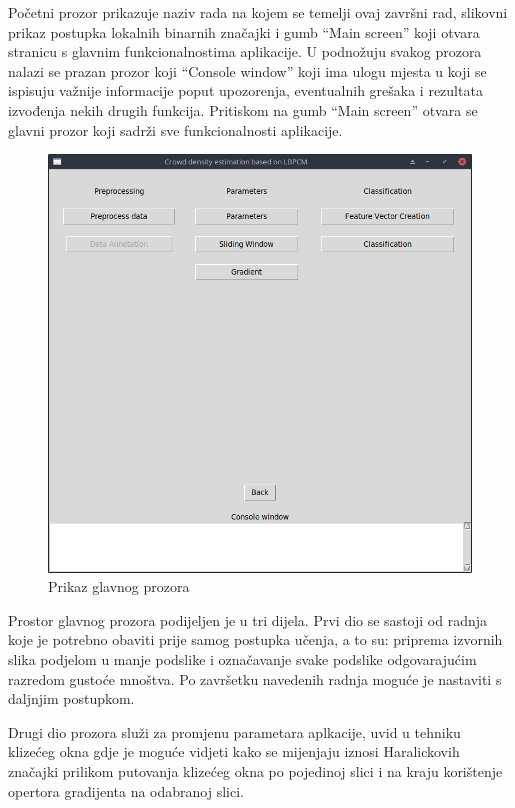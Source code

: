 \documentclass[times, utf8, zavrsni]{fer}
\begin{document}
Početni prozor prikazuje naziv rada na kojem se temelji ovaj završni rad, 
slikovni prikaz postupka lokalnih binarnih značajki i gumb \enquote{Main screen}
koji otvara stranicu s glavnim funkcionalnostima aplikacije. U podnožuju svakog
prozora nalazi se prazan prozor koji \enquote{Console window} koji ima ulogu
mjesta u koji se ispisuju važnije informacije poput upozorenja, eventualnih 
grešaka i rezultata izvođenja nekih drugih funkcija. Pritiskom na gumb \enquote{Main screen}
otvara se glavni prozor koji sadrži sve funkcionalnosti aplikacije.

\begin{figure}[ht]
\centering
\includegraphics[scale=0.4]{img/mainscreen.png}
\caption{Prikaz glavnog prozora}
\end{figure}

Prostor glavnog prozora podijeljen je u tri dijela. Prvi dio se sastoji
od radnja koje je potrebno obaviti prije samog postupka učenja, a to su:
priprema izvornih slika podjelom u manje podslike i označavanje svake 
podslike odgovarajućim razredom gustoće mnoštva. Po završetku navedenih radnja
moguće je nastaviti s daljnjim postupkom.

\bigbreak

Drugi dio prozora služi za promjenu parametara aplkacije, uvid u tehniku 
klizećeg okna gdje je moguće vidjeti kako se mijenjaju iznosi Haralickovih značajki
prilikom putovanja klizećeg okna po pojedinoj slici i na kraju korištenje
opertora gradijenta na odabranoj slici.
\end{document}
